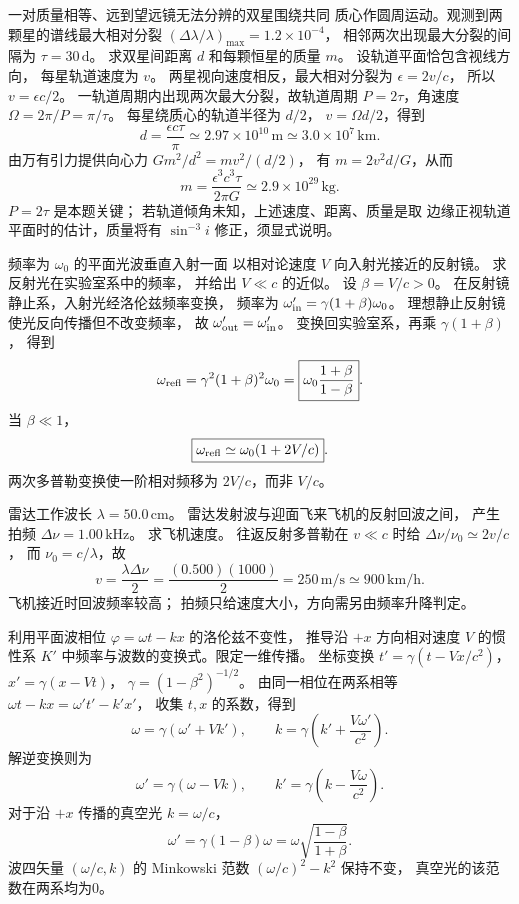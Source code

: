 一对质量相等、远到望远镜无法分辨的双星围绕共同
质心作圆周运动。观测到两颗星的谱线最大相对分裂
$(\Delta\lambda/\lambda)_{\max}
=1.2\times10^{-4}$，
相邻两次出现最大分裂的间隔为
$\tau=30\,\mathrm d$。
求双星间距离 $d$ 和每颗恒星的质量 $m$。
\exsolution
设轨道平面恰包含视线方向，
每星轨道速度为 $v$。
两星视向速度相反，最大相对分裂为
$\epsilon=2v/c$，
所以 $v=\epsilon c/2$。
一轨道周期内出现两次最大分裂，故轨道周期
$P=2\tau$，角速度
$\Omega=2\pi/P=\pi/\tau$。
每星绕质心的轨道半径为 $d/2$，
$v=\Omega d/2$，得到
\[
 \boxed{d=\frac{\epsilon c\tau}{\pi}
 \simeq2.97\times10^{10}\,\mathrm m
 \simeq3.0\times10^7\,\mathrm{km}}.
\]
由万有引力提供向心力
$Gm^2/d^2=m v^2/(d/2)$，
有 $m=2v^2d/G$，从而
\[
 \boxed{m=\frac{\epsilon^3c^3\tau}{2\pi G}
 \simeq2.9\times10^{29}\,\mathrm{kg}}.
\]
\excheck $P=2\tau$ 是本题关键；
若轨道倾角未知，上述速度、距离、质量是取
边缘正视轨道平面时的估计，质量将有 $\sin^{-3}i$
修正，须显式说明。

频率为 $\omega_0$ 的平面光波垂直入射一面
以相对论速度 $V$ 向入射光接近的反射镜。
求反射光在实验室系中的频率，
并给出 $V\ll c$ 的近似。
\exsolution
设 $\beta=V/c>0$。
在反射镜静止系，入射光经洛伦兹频率变换，
频率为
$\omega_{\rm in}'=\gamma(1+\beta)\omega_0$。
理想静止反射镜使光反向传播但不改变频率，
故 $\omega_{\rm out}'=\omega_{\rm in}'$。
变换回实验室系，再乘
$\gamma(1+\beta)$，
得到
\[
 \omega_{\rm refl}
 =\gamma^2(1+\beta)^2\omega_0
 =\boxed{\omega_0\frac{1+\beta}{1-\beta}}.
\]
当 $\beta\ll1$，
\[
 \boxed{\omega_{\rm refl}\simeq\omega_0(1+2V/c)}.
\]
\excheck 两次多普勒变换使一阶相对频移为
$2V/c$，而非 $V/c$。

雷达工作波长 $\lambda=50.0\,\mathrm{cm}$。
雷达发射波与迎面飞来飞机的反射回波之间，
产生拍频 $\Delta\nu=1.00\,\mathrm{kHz}$。
求飞机速度。
\exsolution
往返反射多普勒在 $v\ll c$ 时给
$\Delta\nu/\nu_0\simeq2v/c$，
而 $\nu_0=c/\lambda$，故
\[
 \boxed{v=\frac{\lambda\Delta\nu}{2}
 =\frac{(0.500)(1000)}2
 =250\,\mathrm{m/s}
 \simeq900\,\mathrm{km/h}}.
\]
\excheck 飞机接近时回波频率较高；
拍频只给速度大小，方向需另由频率升降判定。

利用平面波相位
$\varphi=\omega t-kx$ 的洛伦兹不变性，
推导沿 $+x$ 方向相对速度 $V$ 的惯性系
$K'$ 中频率与波数的变换式。限定一维传播。
\exsolution
坐标变换
$t'=\gamma(t-Vx/c^2)$，
$x'=\gamma(x-Vt)$，
$\gamma=(1-\beta^2)^{-1/2}$。
由同一相位在两系相等
$\omega t-kx=\omega't'-k'x'$，
收集 $t,x$ 的系数，得到
\[
 \omega=\gamma(\omega'+Vk'),\qquad
 k=\gamma\left(k'+\frac{V\omega'}{c^2}\right).
\]
解逆变换则为
\[
 \boxed{\omega'=\gamma(\omega-Vk)},\qquad
 \boxed{k'=\gamma\left(k-\frac{V\omega}{c^2}\right)}.
\]
对于沿 $+x$ 传播的真空光 $k=\omega/c$，
\[
 \boxed{\omega'=\gamma(1-\beta)\omega
 =\omega\sqrt{\frac{1-\beta}{1+\beta}}}.
\]
\excheck 波四矢量
$(\omega/c,k)$ 的 Minkowski 范数
$(\omega/c)^2-k^2$ 保持不变，
真空光的该范数在两系均为0。

